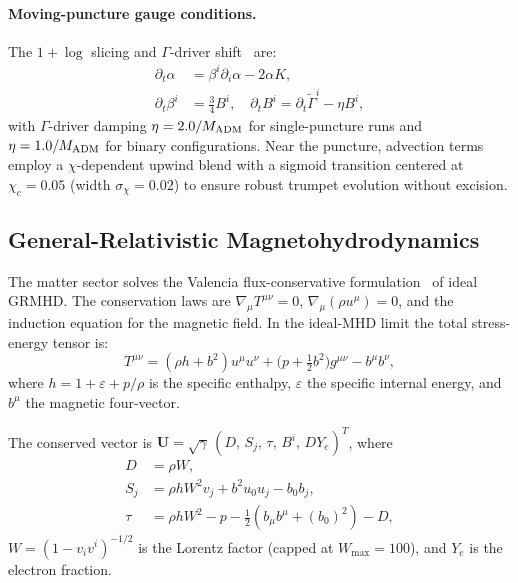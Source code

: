 \documentclass[aps,prd,twocolumn,superscriptaddress,nofootinbib,showpacs,
               longbibliography]{revtex4-2}
\begin{document}
\paragraph{Moving-puncture gauge conditions.}
The $1+\log$ slicing and $\Gamma$-driver shift~\cite{Campanelli2006,Baker2006}
are:
\begin{align}
  \partial_t\alpha &= \beta^i\partial_i\alpha - 2\alpha K,
  \label{eq:1log} \\
  \partial_t\beta^i &= \tfrac{3}{4}B^i,\quad
  \partial_t B^i = \partial_t\tilde\Gamma^i - \eta B^i,
  \label{eq:gamma_driver}
\end{align}
with $\Gamma$-driver damping $\eta = 2.0/M_{\rm ADM}$ for single-puncture
runs and $\eta = 1.0/M_{\rm ADM}$ for binary configurations.
Near the puncture, advection terms employ a $\chi$-dependent upwind blend
with a sigmoid transition centered at $\chi_c = 0.05$ (width $\sigma_\chi =
0.02$) to ensure robust trumpet evolution without
excision.

\subsection{General-Relativistic Magnetohydrodynamics}
\label{sec:grmhd_formalism}

The matter sector solves the Valencia flux-conservative
formulation~\cite{Banyuls1997} of ideal GRMHD.
The conservation laws are $\nabla_\mu T^{\mu\nu} = 0$, $\nabla_\mu(\rho u^\mu)
= 0$, and the induction equation for the magnetic field.
In the ideal-MHD limit the total stress-energy tensor is:
\begin{equation}
  T^{\mu\nu} = (\rho h + b^2)u^\mu u^\nu
             + \bigl(p + \tfrac{1}{2}b^2\bigr)g^{\mu\nu}
             - b^\mu b^\nu,
\end{equation}
where $h = 1 + \varepsilon + p/\rho$ is the specific enthalpy, $\varepsilon$
the specific internal energy, and $b^\mu$ the magnetic four-vector.

The conserved vector is
$\mathbf{U} = \sqrt{\gamma}\,(D,\,S_j,\,\tau,\,B^i,\,DY_e)^T$,
where
\begin{align}
  D &= \rho W, \\
  S_j &= \rho h W^2 v_j + b^2 u_0 u_j - b_0 b_j, \\
  \tau &= \rho h W^2 - p - \tfrac{1}{2}(b_\mu b^\mu + (b_0)^2) - D,
\end{align}
$W = (1 - v_iv^i)^{-1/2}$ is the Lorentz factor (capped at $W_{\max}=100$),
and $Y_e$ is the electron fraction.
\end{document}
